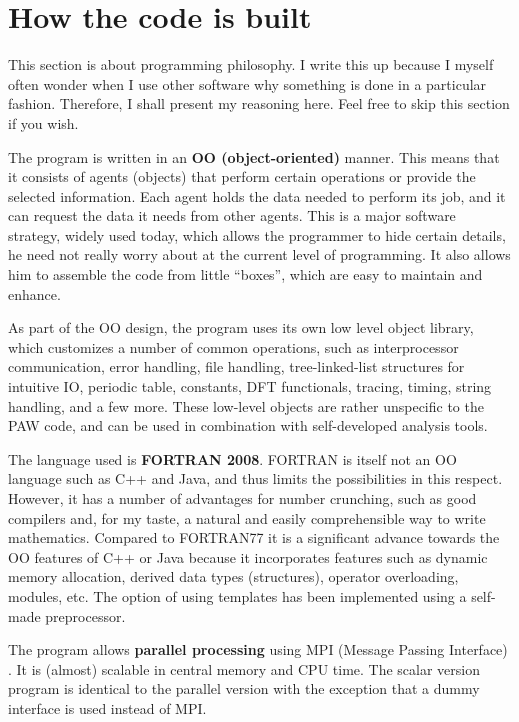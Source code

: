 \documentclass[final,12pt,makeidx,DIV=calc]{article}
\begin{document}
\section{How the code is built}

This section is about programming philosophy.  I write this up because
I myself often wonder when I use other software why something is done
in a particular fashion. Therefore, I shall present my reasoning here.
Feel free to skip this section if you wish.

The program is written in an {\bf OO (object-oriented)} manner. This
means that it consists of agents (objects) that perform certain
operations or provide the selected information. Each agent holds the
data needed to perform its job, and it can request the data it needs
from other agents. This is a major software strategy, widely used
today, which allows the programmer to hide certain details, he need
not really worry about at the current level of programming. It also
allows him to assemble the code from little ``boxes'', which are easy
to maintain and enhance.

As part of the OO design, the program uses its own low level object
library, which customizes a number of common operations, such as
interprocessor communication, error handling, file handling,
tree-linked-list structures for intuitive IO, periodic table,
constants, DFT functionals, tracing, timing, string handling, and a
few more. These low-level objects are rather unspecific to the PAW
code, and can be used in combination with self-developed analysis
tools. 

The language used is {\bf FORTRAN 2008}. FORTRAN is itself not an OO
language such as C++ and Java, and thus limits the possibilities in
this respect. However, it has a number of advantages for number
crunching, such as good compilers and, for my taste, a natural and
easily comprehensible way to write mathematics. Compared to FORTRAN77
it is a significant advance towards the OO features of C++ or Java
because it incorporates features such as dynamic memory allocation,
derived data types (structures), operator overloading, modules, etc.
The option of using templates has been implemented using a self-made
preprocessor.  

The program allows {\bf parallel processing} using MPI (Message
Passing Interface) \cite{mpi}. It is (almost) scalable in central
memory and CPU time.  The scalar version program is identical to the
parallel version with the exception that a dummy interface is used
instead of MPI.
\end{document}
